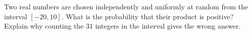 Two real numbers are chosen independently and uniformly at random from the interval $[-20,10]$. What is the probability that their product is positive? Explain why counting the $31$ integers in the interval gives the wrong answer.
